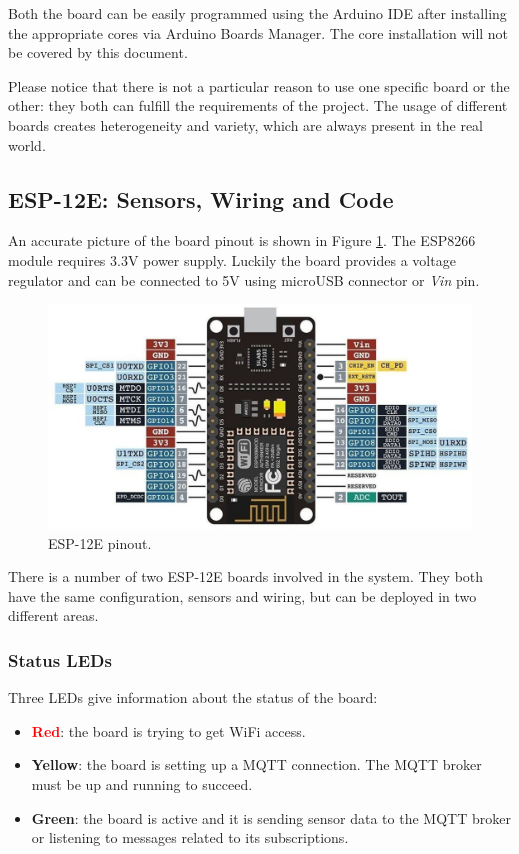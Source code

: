 Both the board can be easily programmed using the Arduino IDE after installing the appropriate cores via Arduino Boards Manager. The core installation will not be covered by this document.

Please notice that there is not a particular reason to use one specific board or the other: they both can fulfill the requirements of the project. The usage of different boards creates heterogeneity and variety, which are always present in the real world. 

\subsection{ESP-12E: Sensors, Wiring and Code}
An accurate picture of the board pinout is shown in Figure \ref{esp12_pinout}. The ESP8266 module requires 3.3V power supply. Luckily the board provides a voltage regulator and can be connected to 5V using microUSB connector or \textit{Vin} pin.

\begin{figure}[H]
	\begin{center}
		\includegraphics[width=\textwidth]{./pictures/ESP-12E_pinout.JPG}
		\caption{ESP-12E pinout.}
		\label{esp12_pinout}
	\end{center}
\end{figure}

\noindent
There is a number of two ESP-12E boards involved in the system. They both have the same configuration, sensors and wiring, but can be deployed in two different areas.

\subsubsection{Status LEDs}
Three LEDs give information about the status of the board:

\begin{itemize}
	\item \textbf{\textcolor{red}{Red}}: the board is trying to get WiFi access.
	\item \textbf{\textcolor[rgb]{1,0.8,0}{Yellow}}: the board is setting up a MQTT connection. The MQTT broker must be up and running to succeed.
	\item \textbf{\textcolor[rgb]{0,0.6,0}{Green}}: the board is active and it is sending sensor data to the MQTT broker or listening to messages related to its subscriptions.
\end{itemize}

